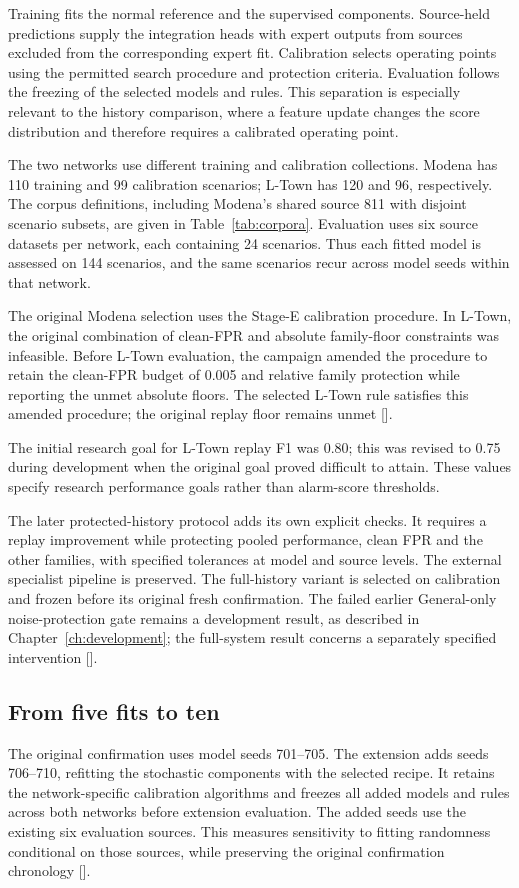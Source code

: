 Training fits the normal reference and the supervised components. Source-held predictions supply the integration heads with expert outputs from sources excluded from the corresponding expert fit. Calibration selects operating points using the permitted search procedure and protection criteria. Evaluation follows the freezing of the selected models and rules. This separation is especially relevant to the history comparison, where a feature update changes the score distribution and therefore requires a calibrated operating point.

The two networks use different training and calibration collections. Modena has 110 training and 99 calibration scenarios; L-Town has 120 and 96, respectively. The corpus definitions, including Modena's shared source 811 with disjoint scenario subsets, are given in Table~\ref{tab:corpora}. Evaluation uses six source datasets per network, each containing 24 scenarios. Thus each fitted model is assessed on 144 scenarios, and the same scenarios recur across model seeds within that network.

The original Modena selection uses the Stage-E calibration procedure. In L-Town, the original combination of clean-FPR and absolute family-floor constraints was infeasible. Before L-Town evaluation, the campaign amended the procedure to retain the clean-FPR budget of 0.005 and relative family protection while reporting the unmet absolute floors. The selected L-Town rule satisfies this amended procedure; the original replay floor remains unmet [].

The initial research goal for L-Town replay F1 was 0.80; this was revised to 0.75 during development when the original goal proved difficult to attain. These values specify research performance goals rather than alarm-score thresholds.

The later protected-history protocol adds its own explicit checks. It requires a replay improvement while protecting pooled performance, clean FPR and the other families, with specified tolerances at model and source levels. The external specialist pipeline is preserved. The full-history variant is selected on calibration and frozen before its original fresh confirmation. The failed earlier General-only noise-protection gate remains a development result, as described in Chapter~\ref{ch:development}; the full-system result concerns a separately specified intervention [].

\subsection{From five fits to ten}
The original confirmation uses model seeds 701--705. The extension adds seeds 706--710, refitting the stochastic components with the selected recipe. It retains the network-specific calibration algorithms and freezes all added models and rules across both networks before extension evaluation. The added seeds use the existing six evaluation sources. This measures sensitivity to fitting randomness conditional on those sources, while preserving the original confirmation chronology [].

